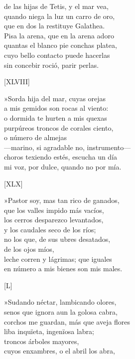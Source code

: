 \documentclass[11pt,a4paper,twoside]{article}
\begin{document}
de las hijas de Tetis, y el mar vea,\\
quando niega la luz un carro de oro,\\
que en dos la restituye Galathea.\\
Pisa la arena, que en la arena adoro\\
quantas el blanco pie conchas platea,\\
cuyo bello contacto puede hacerlas\\
sin concebir roció, parir perlas.\pend 
\begin{center}
	[XLVIII]
\end{center}\pstart
»Sorda hija del mar, cuyas orejas\\
a mis gemidos son rocas al viento:\\
o dormida te hurten a mis quexas\\
purpúreos troncos de corales ciento,\\
o  número de almejas\\
—marino, si agradable no, instrumento—\\
choros texiendo estés, escucha un día\\
mi voz, por dulce, quando no por mía.\pend
\begin{center}
	[XLX]
\end{center}\pstart
»Pastor soy, mas tan rico de ganados,\\
que los valles impido más vacíos,\\
los cerros desparezco levantados,\\
y los caudales seco de los ríos;\\
no los que, de sus ubres desatados,\\
 de los ojos míos,\\
leche corren y lágrimas; que iguales\\
en número a mis bienes son mis males.\pend
\begin{center}
	[L]
\end{center}\pstart
»Sudando néctar, lambicando olores,\\
senos que ignora aun la golosa cabra,\\
corchos me guardan, más que aveja flores\\
liba inquïeta, ingenïosa labra;\\
troncos  árboles mayores,\\
cuyos enxambres, o el abril los abra,\\
\end{document}
